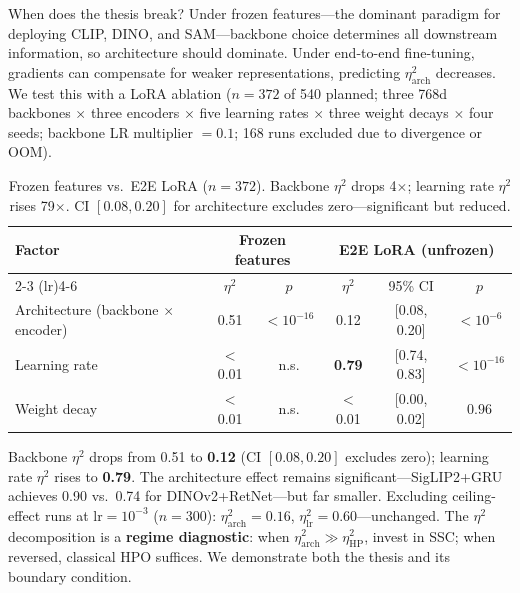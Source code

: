 \documentclass{article}
\begin{document}
When does the thesis break? Under frozen features---the dominant paradigm for deploying CLIP, DINO, and SAM---backbone choice determines all downstream information, so architecture should dominate. Under end-to-end fine-tuning, gradients can compensate for weaker representations, predicting $\eta^2_{\mathrm{arch}}$ decreases.
We test this with a LoRA ablation ($n = 372$ of 540 planned; three 768d backbones $\times$ three encoders $\times$ five learning rates $\times$ three weight decays $\times$ four seeds; backbone LR multiplier $= 0.1$; 168 runs excluded due to divergence or OOM).

\begin{table}[t]
\centering
\caption{Frozen features vs.\ E2E LoRA ($n = 372$). Backbone $\eta^2$ drops 4$\times$; learning rate $\eta^2$ rises 79$\times$. CI $[0.08, 0.20]$ for architecture excludes zero---significant but reduced.}
\label{tab:e2e_anova}
\small
\begin{tabular}{@{}lccccc@{}}
\toprule
Factor & \multicolumn{2}{c}{Frozen features} & \multicolumn{3}{c}{E2E LoRA (unfrozen)} \\
\cmidrule(lr){2-3} \cmidrule(lr){4-6}
 & $\eta^2$ & $p$ & $\eta^2$ & 95\% CI & $p$ \\
\midrule
Architecture (backbone $\times$ encoder) & 0.51 & $<10^{-16}$ & 0.12 & [0.08, 0.20] & $< 10^{-6}$ \\
Learning rate & $<$0.01 & n.s. & \textbf{0.79} & [0.74, 0.83] & $< 10^{-16}$ \\
Weight decay & $<$0.01 & n.s. & $<$0.01 & [0.00, 0.02] & $0.96$ \\
\bottomrule
\end{tabular}
\end{table}

Backbone $\eta^2$ drops from 0.51 to \textbf{0.12} (CI $[0.08, 0.20]$ excludes zero); learning rate $\eta^2$ rises to \textbf{0.79}. The architecture effect remains significant---SigLIP2+GRU achieves 0.90 vs.\ 0.74 for DINOv2+RetNet---but far smaller.
Excluding ceiling-effect runs at lr$=10^{-3}$ ($n = 300$): $\eta^2_{\mathrm{arch}} = 0.16$, $\eta^2_{\mathrm{lr}} = 0.60$---unchanged.
The $\eta^2$ decomposition is a \textbf{regime diagnostic}: when $\eta^2_{\mathrm{arch}} \gg \eta^2_{\mathrm{HP}}$, invest in SSC; when reversed, classical HPO suffices. We demonstrate both the thesis and its boundary condition.


\end{document}

